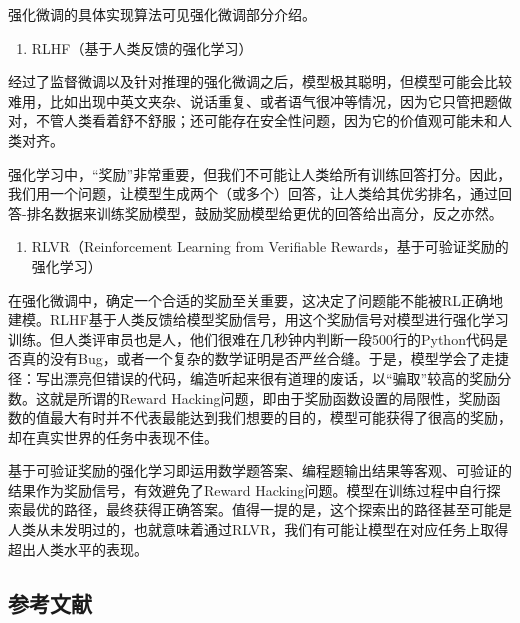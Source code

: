 强化微调的具体实现算法可见强化微调部分介绍。

\begin{enumerate}
\def\labelenumi{\arabic{enumi}.}
\setcounter{enumi}{2}
\tightlist
\item
  RLHF（基于人类反馈的强化学习）
\end{enumerate}

经过了监督微调以及针对推理的强化微调之后，模型极其聪明，但模型可能会比较难用，比如出现中英文夹杂、说话重复、或者语气很冲等情况，因为它只管把题做对，不管人类看着舒不舒服；还可能存在安全性问题，因为它的价值观可能未和人类对齐。

强化学习中，``奖励''非常重要，但我们不可能让人类给所有训练回答打分。因此，我们用一个问题，让模型生成两个（或多个）回答，让人类给其优劣排名，通过回答-排名数据来训练奖励模型，鼓励奖励模型给更优的回答给出高分，反之亦然。

\begin{enumerate}
\def\labelenumi{\arabic{enumi}.}
\setcounter{enumi}{3}
\tightlist
\item
  RLVR（Reinforcement Learning from Verifiable Rewards，基于可验证奖励的强化学习）
\end{enumerate}

在强化微调中，确定一个合适的奖励至关重要，这决定了问题能不能被RL正确地建模。RLHF基于人类反馈给模型奖励信号，用这个奖励信号对模型进行强化学习训练。但人类评审员也是人，他们很难在几秒钟内判断一段500行的Python代码是否真的没有Bug，或者一个复杂的数学证明是否严丝合缝。于是，模型学会了走捷径：写出漂亮但错误的代码，编造听起来很有道理的废话，以``骗取''较高的奖励分数。这就是所谓的Reward Hacking问题，即由于奖励函数设置的局限性，奖励函数的值最大有时并不代表最能达到我们想要的目的，模型可能获得了很高的奖励，却在真实世界的任务中表现不佳。

基于可验证奖励的强化学习即运用数学题答案、编程题输出结果等客观、可验证的结果作为奖励信号，有效避免了Reward Hacking问题。模型在训练过程中自行探索最优的路径，最终获得正确答案。值得一提的是，这个探索出的路径甚至可能是人类从未发明过的，也就意味着通过RLVR，我们有可能让模型在对应任务上取得超出人类水平的表现。

\hypertarget{ux53c2ux8003ux6587ux732e-76}{%
\subsection{参考文献}\label{ux53c2ux8003ux6587ux732e-76}}


